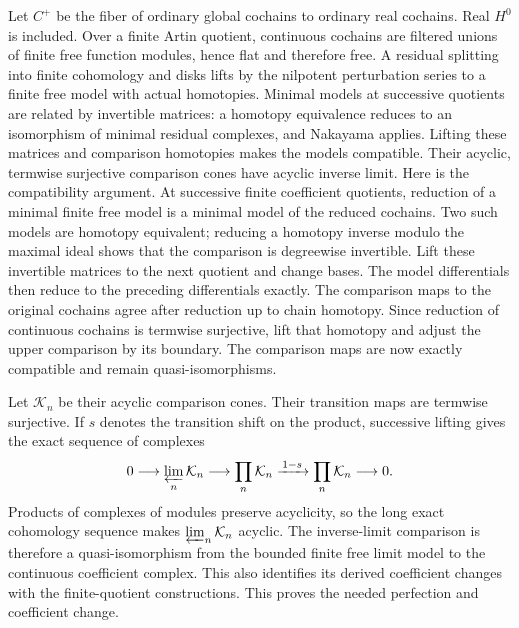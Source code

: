 Let $C^+$ be the fiber of ordinary global cochains to ordinary real
cochains. Real $H^0$ is included. Over a finite Artin quotient,
continuous cochains are filtered unions of finite free function
modules, hence flat and therefore free. A residual splitting into
finite cohomology and disks lifts by the nilpotent perturbation
series to a finite free model with actual homotopies. Minimal models
at successive quotients are related by invertible matrices:
a homotopy equivalence reduces to an isomorphism of minimal residual
complexes, and Nakayama applies. Lifting these matrices and comparison
homotopies makes the models compatible. Their acyclic, termwise
surjective comparison cones have acyclic inverse limit.
Here is the compatibility argument. At successive finite coefficient
quotients, reduction of a minimal finite free model is a minimal model
of the reduced cochains. Two such models are homotopy equivalent;
reducing a homotopy inverse modulo the maximal ideal shows that the
comparison is degreewise invertible. Lift these invertible matrices
to the next quotient and change bases. The model differentials then
reduce to the preceding differentials exactly. The comparison maps
to the original cochains agree after reduction up to chain homotopy.
Since reduction of continuous cochains is termwise surjective, lift
that homotopy and adjust the upper comparison by its boundary. The
comparison maps are now exactly compatible and remain
quasi-isomorphisms.

Let $\mathcal K_n$ be their acyclic comparison cones. Their transition
maps are termwise surjective. If $s$ denotes the transition shift on
the product, successive lifting gives the exact sequence of complexes
\[
 0\longrightarrow\varprojlim_n\mathcal K_n
 \longrightarrow\prod_n\mathcal K_n
 \xrightarrow{\,1-s\,}\prod_n\mathcal K_n
 \longrightarrow0.
\]
Products of complexes of modules preserve acyclicity, so the long
exact cohomology sequence makes $\varprojlim_n\mathcal K_n$ acyclic.
The inverse-limit comparison is therefore a quasi-isomorphism from
the bounded finite free limit model to the continuous coefficient
complex. This also identifies its derived coefficient changes with
the finite-quotient constructions.
This proves the needed perfection and coefficient change.

